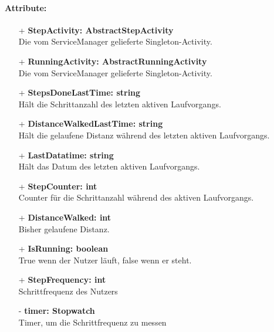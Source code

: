 \documentclass[a4paper,12pt]{article}
\begin{document}
\paragraph{Attribute:}
\begin{itemize}
	\item[+] \textbf{StepActivity: AbstractStepActivity} \\ Die vom ServiceManager gelieferte Singleton-Activity.
	\item[+] \textbf{RunningActivity: AbstractRunningActivity} \\ Die vom ServiceManager gelieferte Singleton-Activity.
	\item[+] \textbf{StepsDoneLastTime: string} \\ Hält die Schrittanzahl des letzten aktiven Laufvorgangs. 
	\item[+] \textbf{DistanceWalkedLastTime: string} \\ Hält die gelaufene Distanz während des letzten aktiven Laufvorgangs. 
	\item[+] \textbf{LastDatatime: string} \\ Hält das Datum des letzten aktiven Laufvorgangs. 
	\item[+] \textbf{StepCounter: int} \\ Counter für die Schrittanzahl während des aktiven Laufvorgangs. 
	\item[+] \textbf{DistanceWalked: int} \\  Bisher gelaufene Distanz. 
	\item[+] \textbf{IsRunning: boolean} \\ True wenn der Nutzer läuft, false wenn er steht. 
	\item[+] \textbf{StepFrequency: int} \\ Schrittfrequenz des Nutzers
	\item[-] \textbf{timer: Stopwatch} \\ Timer, um die Schrittfrequenz zu messen

\end{itemize}
\end{document}
